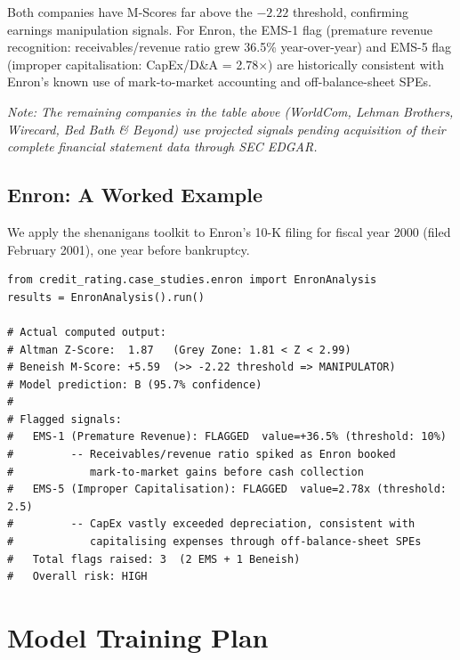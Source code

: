 \documentclass[12pt, a4paper]{article}
\begin{document}
\noindent Both companies have M-Scores far above the $-2.22$ threshold, confirming earnings manipulation signals.  For Enron, the EMS-1 flag (premature revenue recognition: receivables/revenue ratio grew 36.5\% year-over-year) and EMS-5 flag (improper capitalisation: CapEx/D\&A = 2.78$\times$) are historically consistent with Enron's known use of mark-to-market accounting and off-balance-sheet SPEs.

\medskip\noindent\textit{Note: The remaining companies in the table above (WorldCom, Lehman Brothers, Wirecard, Bed Bath \& Beyond) use projected signals pending acquisition of their complete financial statement data through SEC EDGAR.}

\subsection{Enron: A Worked Example}

We apply the shenanigans toolkit to Enron's 10-K filing for fiscal year 2000 (filed February 2001), one year before bankruptcy.

\begin{lstlisting}[caption={Enron shenanigan signals (2000 10-K) --- actual output}, label=lst:enron]
from credit_rating.case_studies.enron import EnronAnalysis
results = EnronAnalysis().run()

# Actual computed output:
# Altman Z-Score:  1.87   (Grey Zone: 1.81 < Z < 2.99)
# Beneish M-Score: +5.59  (>> -2.22 threshold => MANIPULATOR)
# Model prediction: B (95.7% confidence)
#
# Flagged signals:
#   EMS-1 (Premature Revenue): FLAGGED  value=+36.5% (threshold: 10%)
#         -- Receivables/revenue ratio spiked as Enron booked
#            mark-to-market gains before cash collection
#   EMS-5 (Improper Capitalisation): FLAGGED  value=2.78x (threshold: 2.5)
#         -- CapEx vastly exceeded depreciation, consistent with
#            capitalising expenses through off-balance-sheet SPEs
#   Total flags raised: 3  (2 EMS + 1 Beneish)
#   Overall risk: HIGH
\end{lstlisting}

\newpage

\section{Model Training Plan}
\label{sec:training}
\end{document}
